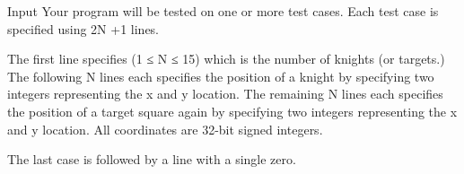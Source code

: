 Input
Your program will be tested on one or more test cases. Each test case is specified using 2N +1 lines.


The first line specifies (1 ≤ N ≤ 15) which is the number of knights (or targets.) The following N lines each specifies the position of a knight by specifying two integers representing the x and y location. The remaining N lines each specifies the position of a target square again by specifying two integers representing the x and y location. All coordinates are 32-bit signed integers.


The last case is followed by a line with a single zero.